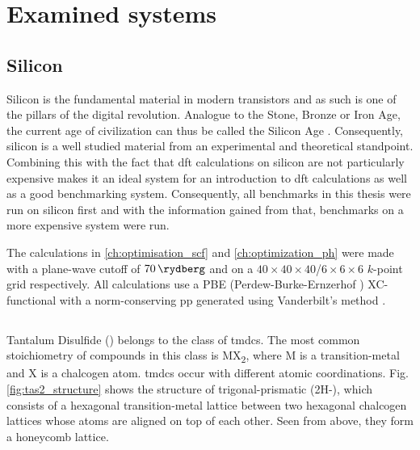 \documentclass[main.tex]{subfiles}
\begin{document}
\chapter{Examined systems}\label{ch:examined_systems}

\section{Silicon}\label{sec:systems_silicon}

Silicon is the fundamental material in modern transistors and as such is one of the pillars of the digital revolution.
Analogue to the Stone, Bronze or Iron Age, the current age of civilization can thus be called the Silicon Age \cite{chabal_fundamental_2001}.
Consequently, silicon is a well studied material from an experimental and theoretical standpoint.
Combining this with the fact that \acrshort{dft} calculations on silicon are not particularly expensive makes it an ideal system for an introduction to \acrshort{dft} calculations as well as a good benchmarking system.
Consequently, all benchmarks in this thesis were run on silicon first and with the information gained from that, benchmarks on a more expensive system were run.

The calculations in \cref{ch:optimisation_scf} and \ref{ch:optimization_ph} were made with a plane-wave cutoff of \(\SI{70}{\rydberg}\) and on a \(40\times40\times40\)/\(6\times6\times6\) \(k\)-point grid respectively.
All calculations use a PBE (Perdew-Burke-Ernzerhof \cite{perdew_generalized_1996}) XC-functional with a norm-conserving \acrshort{pp} generated using Vanderbilt's method \cite{hamann_erratum_2017}.

\section{\TaS}\label{sec:systems_tas2}

Tantalum Disulfide (\TaS) belongs to the class of \acrfull{tmdc}s.
The most common stoichiometry of compounds in this class is MX\textsubscript{2}, where M is a transition-metal and X is a chalcogen atom.
\acrshort{tmdc}s occur with different atomic coordinations.
Fig. \ref{fig:tas2_structure} shows the structure of trigonal-prismatic \TaS (2H-\TaS), which consists of a hexagonal transition-metal lattice between two hexagonal chalcogen lattices whose atoms are aligned on top of each other.
Seen from above, they form a honeycomb lattice.
\end{document}
